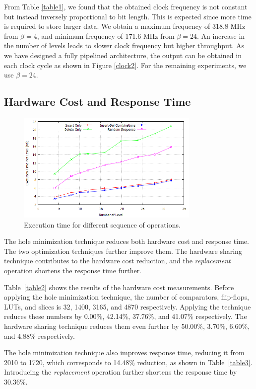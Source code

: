 From Table \ref{table1}, we found that the obtained clock frequency is not constant but instead inversely proportional to bit length. 
This is expected since more time is required to store larger data.
We obtain a maximum frequency of 318.8 MHz from $\beta = 4$, and minimum frequency of 171.6 MHz from $\beta = 24$.
An increase in the number of levels leads to slower clock frequency but higher throughput.
As we have designed a fully pipelined architecture, the output can be obtained in each clock cycle as shown in Figure \ref{clock2}.
For the remaining experiments, we use $\beta = 24$.

\subsection{Hardware Cost and Response Time}

\begin{figure}[!ht]
  \centering
  \includegraphics[width=8.8cm]{fig/random.png}
      \caption{Execution time for different sequence of operations.}
    \label{random}
\end{figure}

The hole minimization technique reduces both hardware cost and response time.
The two optimization techniques further improve them.
The hardware sharing technique contributes to the hardware cost reduction, and the {\it replacement} operation shortens the response time further.

Table~\ref{table2} shows the results of the hardware cost measurements.
Before applying the hole minimization technique, the number of comparators, flip-flops, LUTs, and slices is 32, 1400, 3165, and 4870 respectively.
Applying the technique reduces these numbers by 0.00\%, 42.14\%, 37.76\%, and 41.07\% respectively.
The hardware sharing technique reduces them even further by 50.00\%, 3.70\%, 6.60\%, and 4.88\% respectively.

The hole minimization technique also improves response time, reducing it from 2010 to 1720, which corresponds to 14.48\% reduction, as shown in Table~\ref{table3}.
Introducing the {\it replacement} operation further shortens the response time by 30.36\%.

